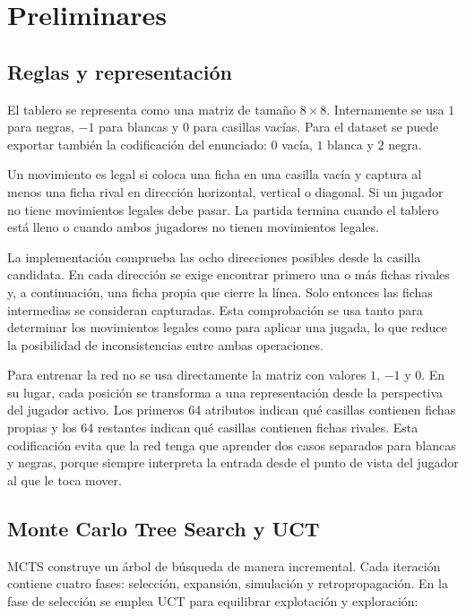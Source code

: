 \documentclass[conference,a4paper]{IEEEtran}
\begin{document}
\section{Preliminares}

\subsection{Reglas y representación}

El tablero se representa como una matriz de tamaño \(8 \times 8\). Internamente
se usa \(1\) para negras, \(-1\) para blancas y \(0\) para casillas vacías. Para
el dataset se puede exportar también la codificación del enunciado:
\(0\) vacía, \(1\) blanca y \(2\) negra.

Un movimiento es legal si coloca una ficha en una casilla vacía y captura al
menos una ficha rival en dirección horizontal, vertical o diagonal. Si un
jugador no tiene movimientos legales debe pasar. La partida termina cuando el
tablero está lleno o cuando ambos jugadores no tienen movimientos legales.

La implementación comprueba las ocho direcciones posibles desde la casilla
candidata. En cada dirección se exige encontrar primero una o más fichas rivales
y, a continuación, una ficha propia que cierre la línea. Solo entonces las
fichas intermedias se consideran capturadas. Esta comprobación se usa tanto para
determinar los movimientos legales como para aplicar una jugada, lo que reduce
la posibilidad de inconsistencias entre ambas operaciones.

Para entrenar la red no se usa directamente la matriz con valores \(1\), \(-1\)
y \(0\). En su lugar, cada posición se transforma a una representación desde la
perspectiva del jugador activo. Los primeros 64 atributos indican qué casillas
contienen fichas propias y los 64 restantes indican qué casillas contienen
fichas rivales. Esta codificación evita que la red tenga que aprender dos casos
separados para blancas y negras, porque siempre interpreta la entrada desde el
punto de vista del jugador al que le toca mover.

\subsection{Monte Carlo Tree Search y UCT}

MCTS construye un árbol de búsqueda de manera incremental. Cada iteración
contiene cuatro fases: selección, expansión, simulación y retropropagación. En
la fase de selección se emplea UCT para equilibrar explotación y exploración:
\end{document}
